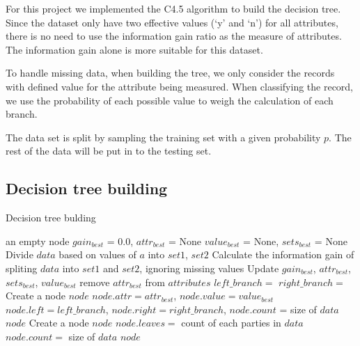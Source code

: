 \documentclass{article}
\begin{document}
For this project we implemented the C4.5 algorithm to build the decision tree. Since the dataset only have two effective values (`y' and `n') for all attributes, there is no need to use the information gain ratio as the measure of attributes. The information gain alone is more suitable for this dataset.

To handle missing data, when building the tree, we only consider the records with defined value for the attribute being measured. When classifying the record, we use the probability of each possible value to weigh the calculation of each branch.

The data set is split by sampling the training set with a given probability $p$. The rest of the data will be put in to the testing set.

\subsection{Decision tree building}

\begin{algorithm}[H]
\centering
\caption{Decision tree bulding}
\label{alg:icm}
  \begin{algorithmic}[1]
        	\State \Return an empty node
        \EndIf
        \State $gain_{best}$ = 0.0, $attr_{best}$ = None
        \State $value_{best}$ = None, $sets_{best}$ = None
    		\State Divide $data$ based on values of $a$ into $set1$, $set2$
    		\State Calculate the information gain of spliting $data$ into $set1$ and $set2$, ignoring missing values
    			\State Update $gain_{best}$, $attr_{best}$, $sets_{best}$, $value_{best}$
    		\EndIf
	    \EndFor
	    	\State remove $attr_{best}$ from $attributes$
	    	\State $left\_branch =$ 
	    	\State $right\_branch =$ 
	    	\State Create a node $node$
	    	\State $node.attr = attr_{best}$, $node.value = value_{best}$
	    	\State $node.left = left\_branch$, $node.right = right\_branch$, $node.count$ = size of $data$
	    	\State \Return $node$
      	\Else
      		\State Create a node $node$
      		\State $node.leaves = $ count of each parties in $data$
      		\State $node.count = $ size of $data$
      		\State \Return $node$
      	\EndIf
    \EndFunction
  \end{algorithmic}
\end{algorithm}
\end{document}
